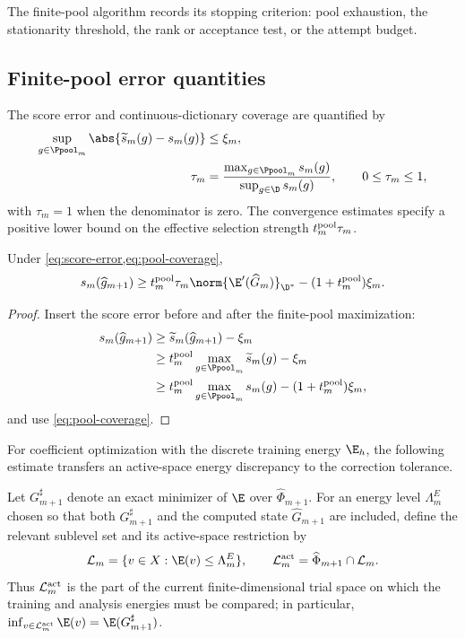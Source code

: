 The finite-pool algorithm records its stopping criterion: pool exhaustion, the stationarity threshold, the rank or acceptance test, or the attempt budget.

\subsection{Finite-pool error quantities}
\label{sec:controlled-selection}

The score error and continuous-dictionary coverage are quantified by
\begin{align}
 \sup_{g\in\Ppool_m}\abs{\widetilde s_m(g)-s_m(g)}&\leq\xi_m,
 \label{eq:score-error}\\
 \tau_m&=\frac{\max_{g\in\Ppool_m}s_m(g)}{\sup_{g\in\D}s_m(g)},\qquad 0\leq\tau_m\leq1,
 \label{eq:pool-coverage}
\end{align}
with \(\tau_m=1\) when the denominator is zero. The convergence estimates specify a positive lower bound on the effective selection strength \(t_m^{\rm pool}\tau_m\).

\begin{lemma}
\label{lem:true-score}
Under \cref{eq:score-error,eq:pool-coverage},
\begin{equation}
 s_m(\widehat g_{m+1})\geq
 t_m^{\rm pool}\tau_m\norm{\E'(\widehat G_m)}_{\D^*}
 -(1+t_m^{\rm pool})\xi_m.
\label{eq:true-score-lower}
\end{equation}
\end{lemma}

\begin{proof}
Insert the score error before and after the finite-pool maximization:
\begin{align*}
s_m(\widehat g_{m+1})
&\geq\widetilde s_m(\widehat g_{m+1})-\xi_m\\
&\geq t_m^{\rm pool}\max_{g\in\Ppool_m}\widetilde s_m(g)-\xi_m\\
&\geq t_m^{\rm pool}\max_{g\in\Ppool_m}s_m(g)
 -(1+t_m^{\rm pool})\xi_m,
\end{align*}
and use \cref{eq:pool-coverage}.
\end{proof}

For coefficient optimization with the discrete training energy \(\E_h\), the following estimate transfers an active-space energy discrepancy to the correction tolerance.

Let \(G_{m+1}^{\sharp}\) denote an exact minimizer of \(\E\) over
\(\widehat\Phi_{m+1}\). For an energy level \(\Lambda_m^E\) chosen so that both
\(G_{m+1}^{\sharp}\) and the computed state \(\widehat G_{m+1}\) are included, define the relevant sublevel
set and its active-space restriction by
\begin{equation}
 \mathcal L_m=\{v\in X:\E(v)\leq\Lambda_m^E\},
 \qquad \mathcal L_m^{\rm act}=\widehat\Phi_{m+1}\cap\mathcal L_m.
 \label{eq:active-sublevel}
\end{equation}
Thus \(\mathcal L_m^{\rm act}\) is the part of the current finite-dimensional trial space on which the
training and analysis energies must be compared; in particular,
\(\inf_{v\in\mathcal L_m^{\rm act}}\E(v)=\E(G_{m+1}^{\sharp})\).

